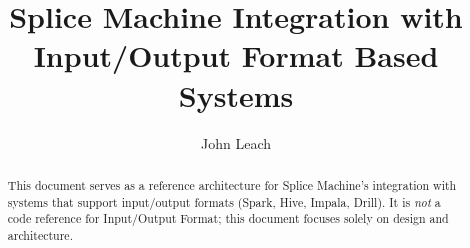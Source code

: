 \documentclass[10pt]{amsart}
\begin{document}
\title{Splice Machine Integration with Input/Output Format Based Systems }
\author{John Leach}

\begin{abstract}
This document serves as a reference architecture for Splice Machine's integration with systems that support 
input/output formats (Spark, Hive, Impala, Drill).    
It is \emph{not} a
code reference for Input/Output Format; this document focuses solely on
design and architecture.
\end{abstract}

\maketitle


\end{document}
